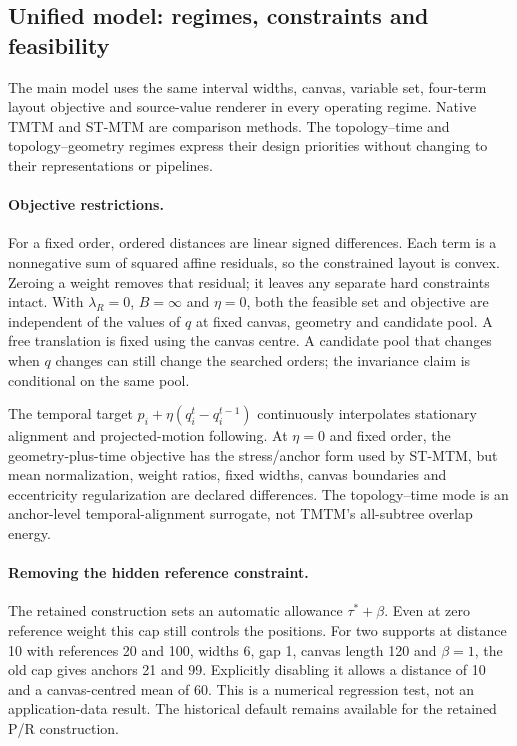 \subsection{Unified model: regimes, constraints and feasibility}\label{supp:framework}
The main model uses the same interval widths, canvas, variable set, four-term layout objective and source-value renderer in every operating regime. Native TMTM and ST-MTM are comparison methods. The topology--time and topology--geometry regimes express their design priorities without changing to their representations or pipelines.

\paragraph{Objective restrictions.}
For a fixed order, ordered distances are linear signed differences. Each term is a nonnegative sum of squared affine residuals, so the constrained layout is convex. Zeroing a weight removes that residual; it leaves any separate hard constraints intact. With $\lambda_R=0$, $B=\infty$ and $\eta=0$, both the feasible set and objective are independent of the values of $q$ at fixed canvas, geometry and candidate pool. A free translation is fixed using the canvas centre. A candidate pool that changes when $q$ changes can still change the searched orders; the invariance claim is conditional on the same pool.

The temporal target $p_i+\eta(q_i^t-q_i^{t-1})$ continuously interpolates stationary alignment and projected-motion following. At $\eta=0$ and fixed order, the geometry-plus-time objective has the stress/anchor form used by ST-MTM, but mean normalization, weight ratios, fixed widths, canvas boundaries and eccentricity regularization are declared differences. The topology--time mode is an anchor-level temporal-alignment surrogate, not TMTM's all-subtree overlap energy.

\paragraph{Removing the hidden reference constraint.}
The retained construction sets an automatic allowance $\tau^*+\beta$. Even at zero reference weight this cap still controls the positions. For two supports at distance 10 with references 20 and 100, widths 6, gap 1, canvas length 120 and $\beta=1$, the old cap gives anchors 21 and 99. Explicitly disabling it allows a distance of 10 and a canvas-centred mean of 60. This is a numerical regression test, not an application-data result. The historical default remains available for the retained P/R construction.

